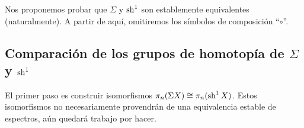 Nos proponemos probar que $\Sigma$ y $\operatorname{sh}^1$ son establemente equivalentes (naturalmente). A partir de aquí, omitiremos los símbolos de composición \enquote{$\circ$}.

\subsection{Comparación de los grupos de homotopía de \texorpdfstring{$\Sigma$ y $\operatorname{sh}^1$}{sigma y sh1}}

El primer paso es construir isomorfismos $\pi_{n}(\Sigma X)\cong\pi_{n}(\operatorname{sh}^1X)$. Estos isomorfismos no necesariamente provendrán de una equivalencia estable de espectros, aún quedará trabajo por hacer.

